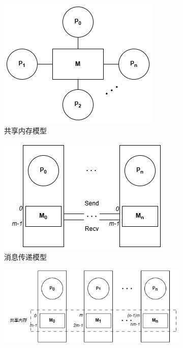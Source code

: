 {  \begin{figure}[!htbp]
    \centering
    \begin{subfigure}[b]{0.35\textwidth}
      \includegraphics[width=\textwidth]{Img/multi-core.png}
      \caption{共享内存模型}
      \label{fig:multi-core}
    \end{subfigure}%
    \hspace{1.5cm}
    \begin{subfigure}[b]{0.35\textwidth}
      \includegraphics[width=\textwidth]{Img/message-passing.png}
      \caption{消息传递模型}
      \label{fig:message-passing}
    \end{subfigure}
    \begin{subfigure}[b]{0.6\textwidth}
      \includegraphics[width=\textwidth]{Img/dsm.png}

\end{subfigure}
\end{figure}}

